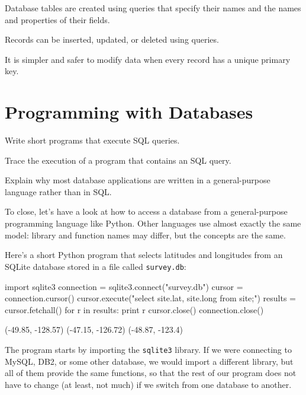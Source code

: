 \begin{keypoints}
\begin{swcitemize}
\item
  Database tables are created using queries that specify their names and
  the names and properties of their fields.
\item
  Records can be inserted, updated, or deleted using queries.
\item
  It is simpler and safer to modify data when every record has a unique
  primary key.
\end{swcitemize}
\end{keypoints}

\section{Programming with Databases}

\begin{objectives}
\begin{swcitemize}
\item
  Write short programs that execute SQL queries.
\item
  Trace the execution of a program that contains an SQL query.
\item
  Explain why most database applications are written in a
  general-purpose language rather than in SQL.
\end{swcitemize}
\end{objectives}

To close, let's have a look at how to access a database from a
general-purpose programming language like Python. Other languages use
almost exactly the same model: library and function names may differ,
but the concepts are the same.

Here's a short Python program that selects latitudes and longitudes from
an SQLite database stored in a file called \texttt{survey.db}:

\begin{VerbIn}
import sqlite3
connection = sqlite3.connect("survey.db")
cursor = connection.cursor()
cursor.execute("select site.lat, site.long from site;")
results = cursor.fetchall()
for r in results:
    print r
cursor.close()
connection.close()
\end{VerbIn}

\begin{VerbOut}
(-49.85, -128.57)
(-47.15, -126.72)
(-48.87, -123.4)
\end{VerbOut}

The program starts by importing the \texttt{sqlite3} library. If we were
connecting to MySQL, DB2, or some other database, we would import a
different library, but all of them provide the same functions, so that
the rest of our program does not have to change (at least, not much) if
we switch from one database to another.

